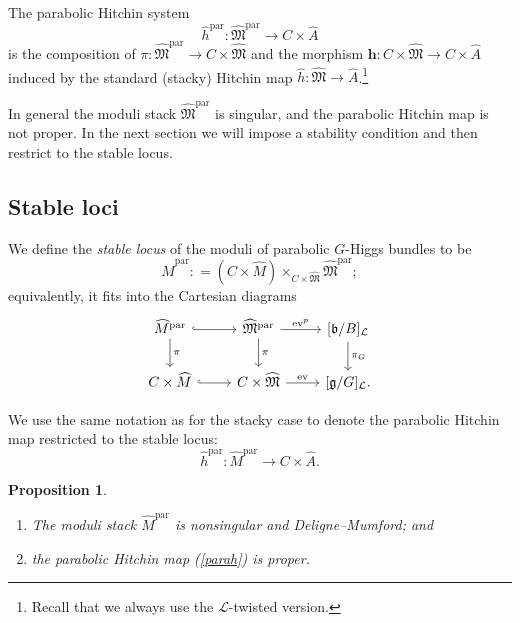 \documentclass[11pt]{amsart}
\theoremstyle{plain}
\newtheorem{prop}[thm]{Proposition}
\theoremstyle{definition}
\theoremstyle{remark}
\newcommand{\CL}{{\mathcal L}}
\newcommand{\FM}{{\mathfrak{M}}}
\begin{document}
The parabolic Hitchin system
\[
\widehat{h}^\mathrm{par}: \widehat{\FM}^{\mathrm{par}} \to C\times \widehat{A}
\]
is the composition of $\pi:\widehat{\FM}^{\mathrm{par}} \to C\times \widehat{\FM}$ and the morphism $\mathbf{h}: C\times \widehat{\FM} \to C\times \widehat{A}$
induced by the standard (stacky) Hitchin map $\widehat{h}: \widehat{\FM} \to \widehat{A}$.\footnote{Recall that we always use the $\CL$-twisted version.}

In general the moduli stack $\widehat{\FM}^{\mathrm{par}}$ is singular, and the parabolic Hitchin map is not proper. In the next section we will impose a stability condition and then restrict to the stable locus. 

\subsection{Stable loci}

We define the \emph{stable locus} of the moduli of parabolic $G$-Higgs bundles to be
\[
\widehat{M}^{\mathrm{par}}: = (C \times \widehat{M}) \times_{C \times \widehat{\FM}} \widehat{\FM}^{{\mathrm{par}}};
\]
equivalently, it fits into the Cartesian diagrams
\begin{equation}\label{diag0}
\begin{tikzcd}
\widehat{M}^{\mathrm{par}} \arrow[r,hook] \arrow[d, "\pi"]&  \widehat{\FM}^{\mathrm{par}} \arrow[r, "\mathrm{ev}^p"] \arrow[d, "\pi"]
&{[\mathfrak{b}/B]_\CL} \arrow[d, "\pi_G"] \\ C \times \widehat{M} \arrow[r,hook]
& C\times \widehat{\FM} \arrow[r, "\mathrm{ev}"]
& {[\mathfrak{g}/G]_\CL}.
\end{tikzcd}
\end{equation}

We use the same notation as for the stacky case to denote the parabolic Hitchin map restricted to the stable locus:
\begin{equation}\label{parah}
\widehat{h}^{\mathrm{par}}: \widehat{M}^{\mathrm{par}} \to C\times \widehat{A}.
\end{equation}

\begin{prop}\label{prop3.1}
\begin{enumerate}
    \item[(i)] The moduli stack $\widehat{M}^{\mathrm{par}}$ is nonsingular and Deligne--Mumford; and
    \item[(ii)] the parabolic Hitchin map (\ref{parah}) is proper.
\end{enumerate}
\end{prop}
\end{document}
